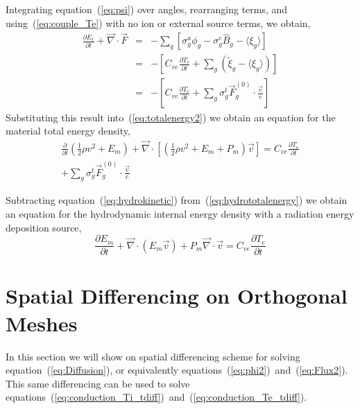\documentclass{article}
\newcommand{\partl}[2]{\ensuremath{\frac{\partial{#1}}{\partial{#2}}}}\newcommand{\del}{\ensuremath{\vec{\nabla}}}
\newcommand{\Bg}{\ensuremath{\hat{B}_{g}}}
\begin{document}
Integrating equation~(\ref{eq:psi}) over angles, rearranging terms,
and using~(\ref{eq:couple_Te}) with no ion or external source terms,
we obtain,
\begin{eqnarray}
   \partl{E_{r}}{t} + \del \cdot \vec{F}
  &=&
    - \sum_{g} \left[ \sigma^{a}_{g} \phi_{g} - \sigma^{e}_{g} \Bg
    - \langle \xi_{g} \rangle \right]
  \\
  &=& 
    - \left[ C_{ve} \partl{T_{e}}{t} + \sum_{g} \left( \tilde{\xi}_{g} 
             - \langle \xi_{g} \rangle \right) \right]
  \\
  &=& 
    - \left[ C_{ve} \partl{T_{e}}{t}
             + \sum_{g} \sigma^{t}_{g} \vec{F}^{(0)}_{g} \cdot \frac{\vec{v}}{c}
      \right]
\end{eqnarray}
Substituting this result into~(\ref{eq:totalenergy2}) we obtain an equation
for the material total energy density,
\begin{multline}
        \partl{}{t}\left( \frac{1}{2} \rho v^2
                          + E_{m}\right)
         + \del \cdot \left[
              \left( \frac{1}{2} \rho v^2 + E_{m} + P_{m} \right) \vec{v}
                      \right]
    =
         C_{ve} \partl{T_{e}}{t}
     \\
            + \sum_{g} \sigma^{t}_{g} \vec{F}^{(0)}_{g} \cdot \frac{\vec{v}}{c} 
\label{eq:hydrototalenergy}
\end{multline}

Subtracting equation~(\ref{eq:hydrokinetic}) from~(\ref{eq:hydrototalenergy})
we obtain an equation for the hydrodynamic internal energy density with
a radiation energy deposition source,
\begin{equation}
  \boxed{
        \partl{E_{m}}{t}
         + \del \cdot \left( E_{m} \vec{v} \right) 
         + P_{m} \del \cdot \vec{v}
    =
         C_{ve} \partl{T_{e}}{t}
  }
\label{eq:hydrointernalenergy}
\end{equation}


\section{Spatial Differencing on Orthogonal Meshes}
\label{ap:spatial}

In this section we will show on spatial differencing scheme for solving
equation~(\ref{eq:Diffusion}), or equivalently
equations~(\ref{eq:phi2})~and~(\ref{eq:Flux2}).
This same differencing can be used to solve
equations~(\ref{eq:conduction_Ti_tdiff})~and~(\ref{eq:conduction_Te_tdiff}).
\end{document}
